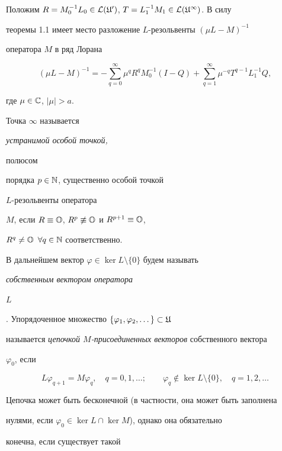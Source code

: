  


Положим $R=M_0^{-1}L_0\in\cal L(\frak U^0)$, $T=L_1^{-1}M_1\in\cal L(\frak U^1)$. В силу 


теоремы 1.1 имеет место разложение $L$-резольвенты $(\mu L-M)^{-1}$ 


оператора $M$ в ряд Лорана 


$$ 


(\mu L-M)^{-1}=-\sum^\infty_{q=0}\mu^qR^qM_0^{-1}(I-Q) 


+\sum^\infty_{q=1}\mu^{-q}T^{q-1}L_1^{-1}Q, 


$$ 


где $\mu\in\Bbb C$, $|\mu|>a$. 


 




\begin{defns} Точка $\infty$ называется {\it устранимой особой точкой, 


полюсом 


порядка $p\in\Bbb N$, существенно особой точкой} $L$-резольвенты оператора 


$M$, если $R\equiv\Bbb O$, $R^p\not\equiv\Bbb O$ и $R^{p+1}\equiv\Bbb O$, 


$R^q\ne\Bbb O$ $\forall q\in\Bbb N$ соответственно. 


\end{defns}


 


В дальнейшем вектор $\varphi\in\ker L\setminus\{0\}$ будем называть 


{\it собственным вектором оператора 


$L$}. Упорядоченное множество $\{\varphi_1,\varphi_2,\dotsc\}\subset\frak U$ 


называется {\it цепочкой $M$-присоединенных векторов} собственного вектора 


$\varphi_0$, если 


$$ 


L\varphi_{q+1}=M\varphi_q, \quad q=0,1,\dotsc;\qquad 


\varphi_q\not\in\ker L\setminus\{0\}, \quad q=1,2,\dotsc 


$$ 


Цепочка может быть бесконечной (в частности, она может быть заполнена 


нулями, если $\varphi_0\in\ker L\cap\ker M$), однако она обязательно 


конечна, если существует такой 


